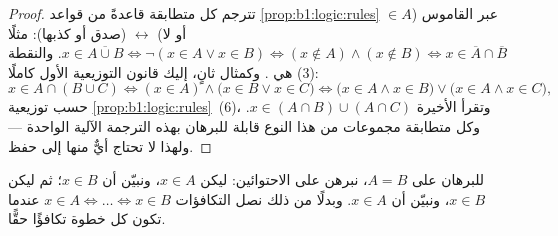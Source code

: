 \begin{proof}
تترجم كل متطابقة قاعدةً من قواعد \cref{prop:b1:logic:rules} عبر
القاموس ($\in A$ أو لا) $\leftrightarrow$ (صدق  أو
كذبها): مثلًا $x \in \overline{A \cup B} \iff \lnot(x \in A \lor x \in
B) \iff (x \notin A) \land (x \notin B) \iff x \in \overline{A} \cap
\overline{B}$. والنقطة (3) هي . وكمثال ثانٍ، إليك قانون
التوزيعية الأول كاملًا:
\[
x \in A \cap (B \cup C)
\iff (x \in A) \land \bigl(x \in B \lor x \in C\bigr)
\iff \bigl(x \in A \land x \in B\bigr) \lor
\bigl(x \in A \land x \in C\bigr),
\]
حسب توزيعية \cref{prop:b1:logic:rules}~(6)، وتقرأ  الأخيرة
$x \in (A \cap B) \cup (A \cap C)$. وكل متطابقة مجموعات من
هذا النوع قابلة للبرهان بهذه الترجمة الآلية الواحدة --- ولهذا لا
تحتاج أيٌّ منها إلى حفظ.
\end{proof}

\begin{method}\label{met:b1:logic:doubleinc}
للبرهان على $A = B$، نبرهن على الاحتوائين: ليكن $x \in A$، ونبيّن
أن $x \in
B$؛ ثم ليكن $x \in B$، ونبيّن أن $x \in A$. وبدلًا من ذلك
نصل التكافؤات $x \in A \iff \dots \iff x \in B$ عندما تكون كل خطوة
تكافؤًا حقًّا.
\end{method}

